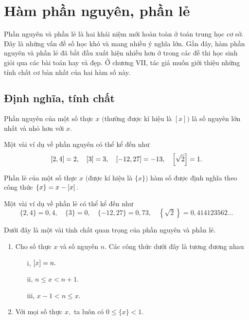 \chapter{Hàm phần nguyên, phần lẻ}

Phần nguyên và phần lẻ là hai khái niệm mới hoàn toàn ở toán trung học cơ sở. Đây là những vấn đề số học khó và mang nhiều ý nghĩa lớn. Gần đây, hàm phần nguyên và phần lẻ đã bắt đầu xuất hiện nhiều hơn ở trong các đề thi học sinh giỏi qua các bài toán hay và đẹp. Ở chương VII, tác giả muốn giới thiệu những tính chất cơ bản nhất của hai hàm số này.

\section*{Định nghĩa, tính chất}

\begin{light}
 Phần nguyên của một số thực $x$ $\big($thường được kí hiệu là $[x]\big)$ là số nguyên lớn nhất và nhỏ hơn với $x.$
\end{light}

Một vài ví dụ về phần nguyên có thể kể đến như
 $$[2,4]=2,\quad [3]=3,\quad [-12,27]=-13,\quad \left[ \sqrt{2} \right]=1.$$
 
\begin{light}
 Phần lẻ của một số thực $x$ $\big($được kí hiệu là $\{x\}\big)$ hàm số được định nghĩa theo công thức $\{x\}=x-\left[ x \right].$
\end{light} 
Một vài ví dụ về phần lẻ có thể kể đến như
 $$\{2,4\}=0,4,\quad \{3\}=0,\quad \{-12,27\}=0,73,\quad \left\{\sqrt{2}\right\}=0,414123562\ldots$$

Dưới đây là một vài tính chất quan trọng của phần nguyên và phần lẻ.
\begin{light}
\begin{enumerate}
    \item Cho số thực $x$ và số nguyên $n.$ Các công thức dưới đây là tương đương nhau
    \begin{multicols}{3}
    \begin{itemize}
        \item[i,] $\left[ x \right]=n.$
        \item[ii,] $n\le x< n+1.$
        \item[iii,] $x-1< n\le x.$
    \end{itemize}
    \end{multicols}
    \item Với mọi số thực $x,$ ta luôn có $0\le\{x\}<1.$
\end{enumerate}
\end{light}

